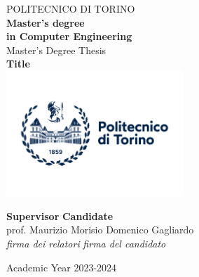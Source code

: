 \begin{titlepage}
    
    \begin{center}
    
    {\huge POLITECNICO DI TORINO}\\[1.5cm]
    \textbf{Master’s degree\\in Computer Engineering}\\[3cm]
    
    {\Large Master's Degree Thesis}\\[0.5cm]
    \textbf{\LARGE Title }\\[2cm]
    \includegraphics[width=0.5\textwidth]{./images/logo/logoPoliTo_with_name_2021.jpg}
    \vspace{2cm}
    
    
    \begin{minipage}{0.85\textwidth}
    \begin{flushleft}\large
    \textbf{Supervisor} \hfill \textbf{Candidate}\\
    prof. Maurizio Morisio \hfill Domenico Gagliardo\\
    \textit{firma dei relatori} \hfill \textit{firma del candidato}\\[0.35cm]
    \end{flushleft}
    \end{minipage}
    
    \vfill
    
    Academic Year 2023-2024
    \end{center}
    
    \restoregeometry %
    
\end{titlepage}

\begin{titlepage}
    
\tableofcontents

\end{titlepage}